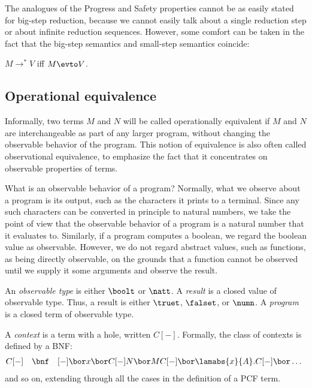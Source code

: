 \documentclass[12pt]{article}
\begin{document}
The analogues of the Progress and Safety properties cannot be as
easily stated for big-step reduction, because we cannot easily talk
about a single reduction step or about infinite reduction sequences. 
However, some comfort can be taken in the fact that the big-step
semantics and small-step semantics coincide:

\begin{proposition}\label{prop-big-small}
  $M\to^* V$ iff $M\evto V$.
\end{proposition}
 
\subsection{Operational equivalence}

Informally, two terms $M$ and $N$ will be called operationally
equivalent if $M$ and $N$ are interchangeable as part of any larger
program, without changing the observable behavior of the program. This
notion of equivalence is also often called observational equivalence,
to emphasize the fact that it concentrates on observable properties of
terms.

What is an observable behavior of a program? Normally, what we observe
about a program is its output, such as the characters it prints to a
terminal. Since any such characters can be converted in principle to
natural numbers, we take the point of view that the observable
behavior of a program is a natural number that it evaluates to. 
Similarly, if a program computes a boolean, we regard the boolean
value as observable. However, we do not regard abstract values, such
as functions, as being directly observable, on the grounds that a
function cannot be observed until we supply it some arguments and
observe the result.

\begin{definition}
  An {\em observable type} is either $\boolt$ or $\natt$. A {\em
  result} is a closed value of observable type. Thus, a result is
  either $\truet$, $\falset$, or $\numn$.  A {\em program} is a closed
  term of observable type. 

  A {\em context} is a term with a hole, written $C[-]$. Formally, the
  class of contexts is defined by a BNF:
  \[ \begin{array}{@{}lll}
    C[-] &\bnf&
    [-] \bor x \bor C[-]N \bor MC[-] \bor \lamabs{x}{A}.C[-]
    \bor \ldots
  \end{array}
  \]
  and so on, extending through all the cases in the definition of a
  PCF term. 
\end{definition}
\end{document}
